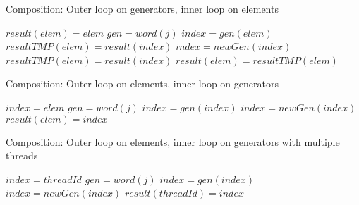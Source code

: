 {\begin{algorithm}
\caption{Composition: Outer loop on generators, inner loop on elements}
\label{algo:composebad}
\begin{algorithmic}
\STATE $result(elem) = elem$
\ENDFOR
{}
\STATE $gen = word(j)$
\STATE $index = gen(elem)$
\STATE $resultTMP(elem) = result(index)$
\ENDFOR
\STATE $index = newGen(index)$
\STATE $resultTMP(elem) = result(index)$
\STATE $result(elem) = resultTMP(elem)$
\ENDFOR
\ENDFOR
\end{algorithmic}
\end{algorithm}



\begin{algorithm}
\caption{Composition: Outer loop on elements, inner loop on generators}
\label{algo:composegood}
\begin{algorithmic}
\STATE $index = elem$
\STATE $gen = word(j)$
\STATE $index = gen(index)$
\ENDFOR
\STATE $index = newGen(index)$
\STATE $result(elem) = index$
\ENDFOR
\end{algorithmic}
\end{algorithm}


\begin{algorithm}
\caption{Composition: Outer loop on elements, inner loop on generators with multiple threads}
\label{algo:composepar}
\begin{algorithmic}
\STATE $index = threadId$
\STATE $gen = word(j)$
\STATE $index = gen(index)$
\ENDFOR
\STATE $index = newGen(index)$
\STATE $result(threadId) = index$
\ENDIF
\end{algorithmic}
\end{algorithm}


}
